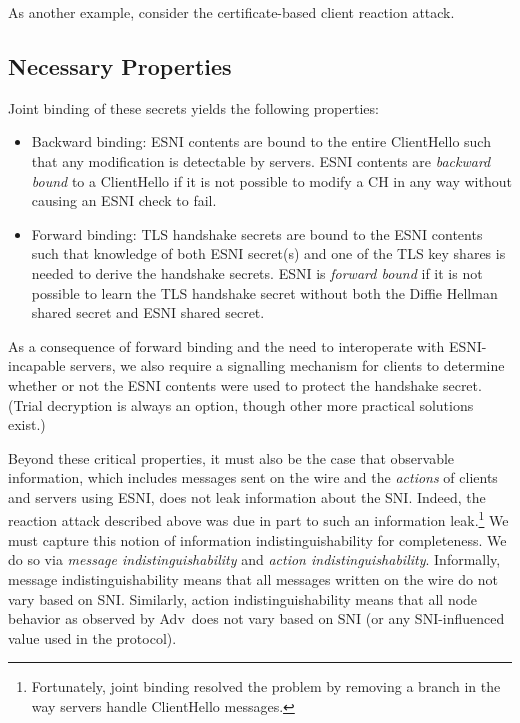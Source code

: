 \documentclass[twoside]{article}
\newcommand{\adv}{{\sf Adv}}
\theoremstyle{definition}
\begin{document}
As another example, consider the certificate-based client reaction attack. 

\subsection{Necessary Properties}

Joint binding of these secrets yields the following properties:
%
\begin{itemize}
  \item Backward binding: ESNI contents are bound to the entire ClientHello such that any modification
  is detectable by servers. ESNI contents are \emph{backward bound} to a ClientHello if it is not possible 
  to modify a CH in any way without causing an ESNI check to fail.
  \item Forward binding: TLS handshake secrets are bound to the ESNI contents such that knowledge of both
  ESNI secret(s) and one of the TLS key shares is needed to derive the handshake secrets. ESNI is \emph{forward
  bound} if it is not possible to learn the TLS handshake secret without both the Diffie Hellman shared secret and 
  ESNI shared secret.
\end{itemize}
%
As a consequence of forward binding and the need to interoperate with ESNI-incapable servers, we also require 
a signalling mechanism for clients to determine whether or not the ESNI contents were used to protect the 
handshake secret. (Trial decryption is always an option, though other more practical solutions exist.)

Beyond these critical properties, it must also be the case that observable information, which includes 
messages sent on the wire and the \emph{actions} of clients and servers using ESNI, does not leak information
about the SNI. Indeed, the reaction attack described above was due in part to such an information 
leak.\footnote{Fortunately, joint binding resolved the problem by removing a branch in the way servers
handle ClientHello messages.} We must capture this notion of information indistinguishability for completeness.
We do so via \emph{message indistinguishability} and \emph{action indistinguishability}. Informally, message 
indistinguishability means that all messages written on the wire do not vary based on SNI. Similarly, action
indistinguishability means that all node behavior as observed by \adv\ does not vary based on SNI (or any SNI-influenced
value used in the protocol).

\end{document}
